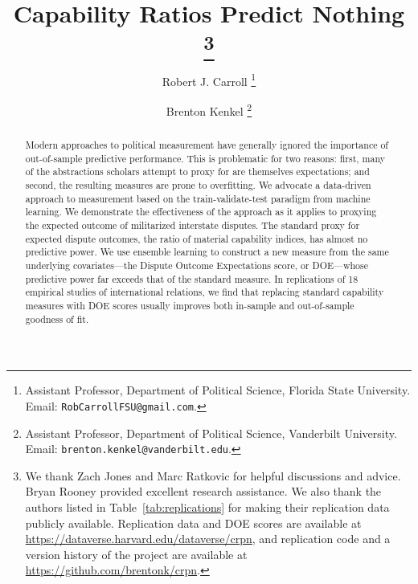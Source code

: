 \documentclass[11pt,oneside]{article}
\title{
  Capability Ratios Predict Nothing%
  \thanks{%
    We thank Zach Jones and Marc Ratkovic for helpful discussions and advice.
    Bryan Rooney provided excellent research assistance.
    We also thank the authors listed in Table~\ref{tab:replications} for making their replication data publicly available.
    Replication data and DOE scores are available at \url{https://dataverse.harvard.edu/dataverse/crpn}, and replication code and a version history of the project are available at \url{https://github.com/brentonk/crpn}.
  }%
}
\author{%
  Robert J. Carroll%
  \thanks{%
    Assistant Professor, Department of Political Science, Florida State University.  Email:  \nolinkurl{RobCarrollFSU@gmail.com}.
  }%
  \and%
  Brenton Kenkel%
  \thanks{
    Assistant Professor, Department of Political Science, Vanderbilt University.
    Email: \nolinkurl{brenton.kenkel@vanderbilt.edu}.
  }%
}
\begin{document}
\maketitle

\begin{abstract}
  Modern approaches to political measurement have generally ignored the importance of out-of-sample predictive performance. 
  This is problematic for two reasons: first, many of the abstractions scholars attempt to proxy for are themselves expectations; and second, the resulting measures are prone to overfitting.
  We advocate a data-driven approach to measurement based on the train-validate-test paradigm from machine learning. 
  We demonstrate the effectiveness of the approach as it applies to proxying the expected outcome of militarized interstate disputes. 
  The standard proxy for expected dispute outcomes, the ratio of material capability indices, has almost no predictive power.
  We use ensemble learning to construct a new measure from the same underlying covariates---the Dispute Outcome Expectations score, or DOE---whose predictive power far exceeds that of the standard measure.
  In replications of 18 empirical studies of international relations, we find that replacing standard capability measures with DOE scores usually improves both in-sample and out-of-sample goodness of fit.
\end{abstract}

\clearpage




















\clearpage
\appendix


\newpage


\end{document}
